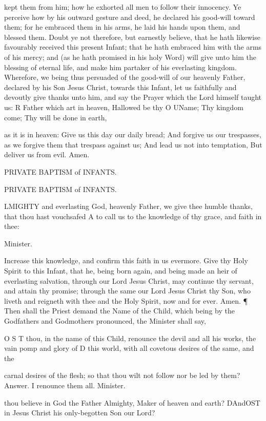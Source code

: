 kept them from him; how he exhorted all men to follow their innocency. Ye perceive how by his outward gesture and deed, he declared his good-will toward them; for he embraced them in his arms, he laid his hands upon them, and blessed them. Doubt ye not therefore, but earnestly believe, that he hath likewise favourably received this present Infant; that he hath embraced him with the arms of his mercy; and (as he hath promised in his holy Word) will give unto him the blessing of eternal life, and make him partaker of his everlasting kingdom. Wherefore, we being thus persuaded of the good-will of our heavenly Father, declared by his Son Jesus Christ, towards this Infant, let us faithfully and devoutly give thanks unto him, and say the Prayer which the Lord himself taught us: R Father which art in heaven, Hallowed be thy O UName; Thy kingdom come; Thy will be done in earth,

as it is in heaven: Give us this day our daily bread; And forgive us our trespasses, as we forgive them that trespass against us; And lead us not into temptation, But deliver us from evil. Amen.

PRIVATE BAPTISM of INFANTS.

PRIVATE BAPTISM of INFANTS.

LMIGHTY and everlasting God, heavenly Father, we give thee humble thanks, that thou hast vouchsafed A to call us to the knowledge of thy grace, and faith in thee:

Minister.

Increase this knowledge, and confirm this faith in us evermore. Give thy Holy Spirit to this Infant, that he, being born again, and being made an heir of everlasting salvation, through our Lord Jesus Christ, may continue thy servant, and attain thy promise; through the same our Lord Jesus Christ thy Son, who liveth and reigneth with thee and the Holy Spirit, now and for ever. Amen. ¶ Then shall the Priest demand the Name of the Child, which being by the Godfathers and Godmothers pronounced, the Minister shall say,

O S T thou, in the name of this Child, renounce the devil and all his works, the vain pomp and glory of D this world, with all covetous desires of the same, and the

carnal desires of the flesh; so that thou wilt not follow nor be led by them? Answer. I renounce them all. Minister.

thou believe in God the Father Almighty, Maker of heaven and earth? DAndOST in Jesus Christ his only-begotten Son our Lord?

